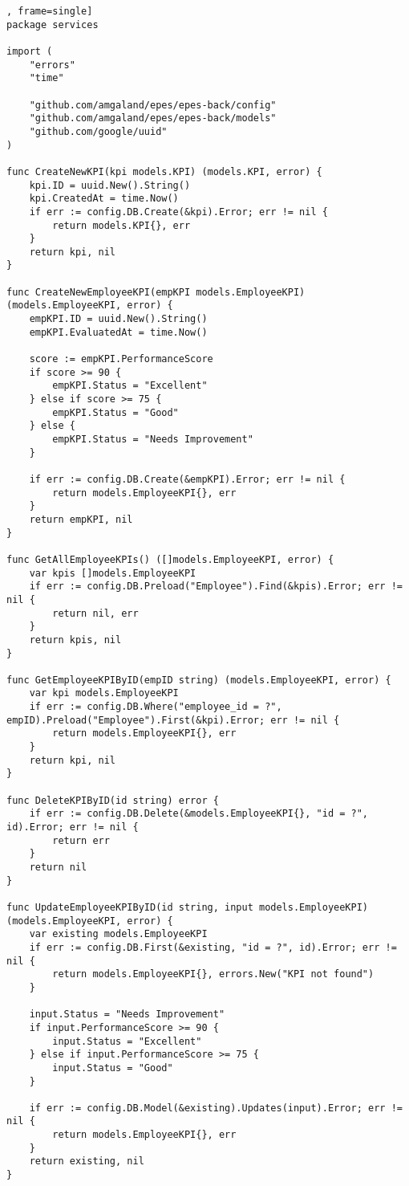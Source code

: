 \begin{lstlisting}[language=Golang, caption=kpi api services [backend], frame=single]
package services

import (
	"errors"
	"time"

	"github.com/amgaland/epes/epes-back/config"
	"github.com/amgaland/epes/epes-back/models"
	"github.com/google/uuid"
)

func CreateNewKPI(kpi models.KPI) (models.KPI, error) {
	kpi.ID = uuid.New().String()
	kpi.CreatedAt = time.Now()
	if err := config.DB.Create(&kpi).Error; err != nil {
		return models.KPI{}, err
	}
	return kpi, nil
}

func CreateNewEmployeeKPI(empKPI models.EmployeeKPI) (models.EmployeeKPI, error) {
	empKPI.ID = uuid.New().String()
	empKPI.EvaluatedAt = time.Now()

	score := empKPI.PerformanceScore
	if score >= 90 {
		empKPI.Status = "Excellent"
	} else if score >= 75 {
		empKPI.Status = "Good"
	} else {
		empKPI.Status = "Needs Improvement"
	}

	if err := config.DB.Create(&empKPI).Error; err != nil {
		return models.EmployeeKPI{}, err
	}
	return empKPI, nil
}

func GetAllEmployeeKPIs() ([]models.EmployeeKPI, error) {
	var kpis []models.EmployeeKPI
	if err := config.DB.Preload("Employee").Find(&kpis).Error; err != nil {
		return nil, err
	}
	return kpis, nil
}

func GetEmployeeKPIByID(empID string) (models.EmployeeKPI, error) {
	var kpi models.EmployeeKPI
	if err := config.DB.Where("employee_id = ?", empID).Preload("Employee").First(&kpi).Error; err != nil {
		return models.EmployeeKPI{}, err
	}
	return kpi, nil
}

func DeleteKPIByID(id string) error {
	if err := config.DB.Delete(&models.EmployeeKPI{}, "id = ?", id).Error; err != nil {
		return err
	}
	return nil
}

func UpdateEmployeeKPIByID(id string, input models.EmployeeKPI) (models.EmployeeKPI, error) {
	var existing models.EmployeeKPI
	if err := config.DB.First(&existing, "id = ?", id).Error; err != nil {
		return models.EmployeeKPI{}, errors.New("KPI not found")
	}

	input.Status = "Needs Improvement"
	if input.PerformanceScore >= 90 {
		input.Status = "Excellent"
	} else if input.PerformanceScore >= 75 {
		input.Status = "Good"
	}

	if err := config.DB.Model(&existing).Updates(input).Error; err != nil {
		return models.EmployeeKPI{}, err
	}
	return existing, nil
}

\end{lstlisting}







